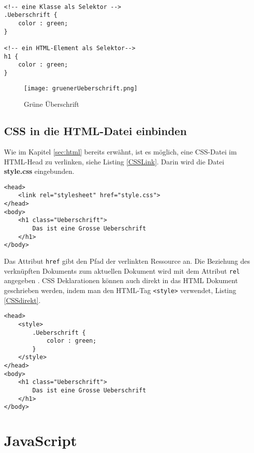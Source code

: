 \begin{lstlisting}[caption= Grüne Überschrift CSS, label=UeberschriftGruen]

<!-- eine Klasse als Selektor -->
.Ueberschrift {
    color : green;
}

<!-- ein HTML-Element als Selektor--> 
h1 {
    color : green;
}
\end{lstlisting}

\begin{figure}[!htb]
    \centering
    \texttt{[image: gruenerUeberschrift.png]}
    \caption{Grüne Überschrift}
    \label{img:UeberschriftGruen}
\end{figure}

\subsection{CSS in die HTML-Datei einbinden}

Wie im Kapitel \ref{sec:html} bereits erwähnt, ist es  möglich, eine CSS-Datei im HTML-Head zu verlinken, siehe Listing \ref{CSSLink}. Darin wird die Datei \textbf{style.css} eingebunden. 

\begin{lstlisting}[caption= CSS-Datei in HTML verlinken, label=CSSLink, float=!htb]
<head>
    <link rel="stylesheet" href="style.css">
</head>
<body>
    <h1 class="Ueberschrift"> 
        Das ist eine Grosse Ueberschrift 
    </h1>
</body>
\end{lstlisting}

Das Attribut \texttt{href} gibt den Pfad der verlinkten Ressource an. Die Beziehung des verknüpften Dokuments zum aktuellen Dokument wird mit dem Attribut \texttt{rel} angegeben \cite{Mozilla2021}.
CSS Deklarationen können auch direkt in das HTML Dokument geschrieben werden, indem man den HTML-Tag \texttt{<style>} verwendet, Listing \ref{CSSdirekt}. 

\begin{lstlisting}[caption= CSS-Datei in HTML einbinden, label=CSSdirekt]
<head>
    <style>
        .Ueberschrift {
            color : green;
        }
    </style>
</head>
<body>
    <h1 class="Ueberschrift"> 
        Das ist eine Grosse Ueberschrift 
    </h1>
</body>
\end{lstlisting}

\section{JavaScript}\label{sec:JavaScript}

